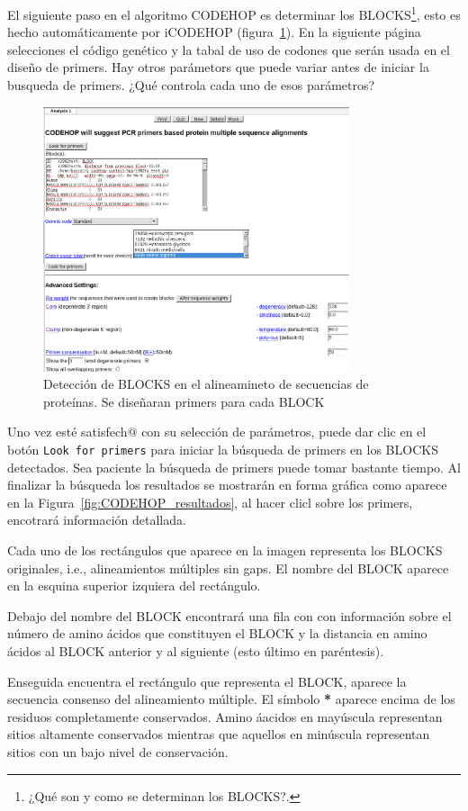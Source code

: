 \documentclass[letter,11pt]{book}
\begin{document}
El siguiente paso en el algoritmo CODEHOP es determinar los BLOCKS\footnote{¿Qué son y como se determinan los BLOCKS?.}, esto es hecho automáticamente por iCODEHOP (figura~\ref{fig:CODEHOP_design3}). En la siguiente página selecciones el código genético y la tabal de uso de codones que serán usada en el diseño de primers. Hay otros parámetors que puede variar antes de iniciar la busqueda de primers. ¿Qué controla cada uno de esos parámetros?

\begin{figure}[h!]
\centering
 \includegraphics[width=9cm]{Figs/CODEHOP_design3.png}
 \caption{\label{fig:CODEHOP_design3}Detección de BLOCKS en el alineamineto de secuencias de proteínas. Se diseñaran primers para cada BLOCK}
\end{figure}

Uno vez esté satisfech@ con su selección de parámetros, puede dar clic en el botón \Verb+Look for primers+ para iniciar la búsqueda de primers en los BLOCKS detectados. Sea paciente la búsqueda de primers puede tomar bastante tiempo. Al finalizar la búsqueda los resultados se mostrarán en forma gráfica como aparece en la Figura~\ref{fig:CODEHOP_resultados}, al hacer clicl sobre los primers, encotrará información detallada.

Cada uno de los rectángulos que aparece en la imagen representa los BLOCKS originales, i.e., alineamientos múltiples sin gaps. El nombre del BLOCK aparece en la esquina superior izquiera del rectángulo.

Debajo del nombre del BLOCK encontrará una fila con con información sobre el número de amino ácidos que constituyen el BLOCK y la distancia en amino ácidos al BLOCK anterior y al siguiente (esto \'{u}ltimo en par\'{e}ntesis).

Enseguida encuentra el rectángulo que representa el BLOCK, aparece la secuencia consenso del alineamiento m\'{u}ltiple. El s\'{i}mbolo \textbf{*} aparece encima de los residuos completamente conservados. Amino \'{a}acidos en may\'{u}scula representan sitios altamente conservados mientras que aquellos en min\'{u}scula representan sitios con un bajo nivel de conservaci\'{o}n.
\end{document}
